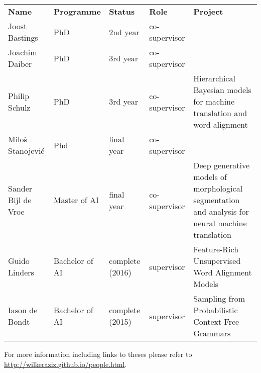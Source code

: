 \begin{tabular}{l l l l p{6cm}}
\bf Name & \bf Programme & \bf Status & \bf Role & \bf Project \\
Joost Bastings & PhD & 2nd year & co-supervisor & \\
Joachim Daiber & PhD & 3rd year & co-supervisor & \\
Philip Schulz  & PhD & 3rd year & co-supervisor & Hierarchical Bayesian models for machine translation and word alignment \\
Milo\v{s} Stanojevi\'c & Phd & final year & co-supervisor & \\
Sander Bijl de Vroe & Master of AI & final year & co-supervisor & Deep generative models of morphological segmentation and analysis for neural machine translation\\
Guido Linders & Bachelor of AI & complete (2016) & supervisor & Feature-Rich Unsupervised Word Alignment Models \\
Iason de Bondt & Bachelor of AI & complete (2015) & supervisor & Sampling from Probabilistic Context-Free Grammars\\
\end{tabular}
For more information including links to theses please refer to \url{http://wilkeraziz.github.io/people.html}.








